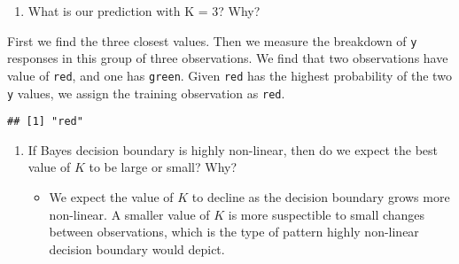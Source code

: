\documentclass[]{book}
\newenvironment{Shaded}{\begin{snugshade}}{\end{snugshade}}
\newcommand{\KeywordTok}[1]{\textcolor[rgb]{0.13,0.29,0.53}{\textbf{#1}}}
\newcommand{\DataTypeTok}[1]{\textcolor[rgb]{0.13,0.29,0.53}{#1}}
\newcommand{\DecValTok}[1]{\textcolor[rgb]{0.00,0.00,0.81}{#1}}
\newcommand{\StringTok}[1]{\textcolor[rgb]{0.31,0.60,0.02}{#1}}
\newcommand{\OperatorTok}[1]{\textcolor[rgb]{0.81,0.36,0.00}{\textbf{#1}}}
\newcommand{\NormalTok}[1]{#1}
\providecommand{\tightlist}{%
  \setlength{\itemsep}{0pt}\setlength{\parskip}{0pt}}
\theoremstyle{definition}
\theoremstyle{definition}
\theoremstyle{definition}
\theoremstyle{remark}
\begin{document}
\begin{enumerate}
\def\labelenumi{(\alph{enumi})}
\setcounter{enumi}{2}
\tightlist
\item
  What is our prediction with K = 3? Why?
\end{enumerate}

First we find the three closest values. Then we measure the breakdown of
\texttt{y} responses in this group of three observations. We find that
two observations have value of \texttt{red}, and one has \texttt{green}.
Given \texttt{red} has the highest probability of the two \texttt{y}
values, we assign the training observation as \texttt{red}.

\begin{Shaded}
\end{Shaded}

\begin{verbatim}
## [1] "red"
\end{verbatim}

\begin{enumerate}
\def\labelenumi{(\alph{enumi})}
\setcounter{enumi}{3}
\tightlist
\item
  If Bayes decision boundary is highly non-linear, then do we expect the
  best value of \(K\) to be large or small? Why?

  \begin{itemize}
  \tightlist
  \item
    We expect the value of \(K\) to decline as the decision boundary
    grows more non-linear. A smaller value of \(K\) is more suspectible
    to small changes between observations, which is the type of pattern
    highly non-linear decision boundary would depict.
  \end{itemize}
\end{enumerate}
\end{document}
